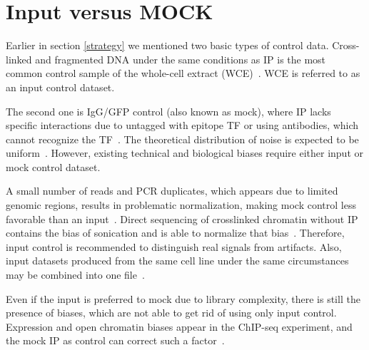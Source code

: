  \section{Input versus MOCK}
 \label{control}

 Earlier in section \ref{strategy} we mentioned two basic types of control data. 
 Cross-linked and fragmented DNA under the same conditions as IP is the most common control sample of the whole-cell extract (WCE)~\cite{kidder2011chip,landt2012chip}. 
 WCE is referred to as an input control dataset. 

 The second one is IgG/GFP control (also known as mock), where IP lacks specific interactions due to untagged with epitope TF or using antibodies, which cannot recognize the TF~\cite{landt2012chip, shin2013computational}.
 The theoretical distribution of noise is expected to be uniform~\cite{robertson2007genome}. 
 However, existing technical and biological biases require either input or mock control dataset.

 A small number of reads and PCR duplicates, which appears due to limited genomic regions, results in problematic normalization, making mock control less favorable than an input~\cite{kidder2011chip}. 
 Direct sequencing of crosslinked chromatin without IP contains the bias of sonication and is able to normalize that bias~\cite{kharchenko2008design}. 
 Therefore, input control is recommended to distinguish real signals from artifacts. 
 Also, input datasets produced from the same cell line under the same circumstances may be combined into one file~\cite{meyer2014identifying}.

 Even if the input is preferred to mock due to library complexity, there is still the presence of biases, which are not able to get rid of using only input control. 
 Expression and open chromatin biases appear in the ChIP-seq experiment, and the mock IP as control can correct such a factor~\cite{park2013widespread}.


